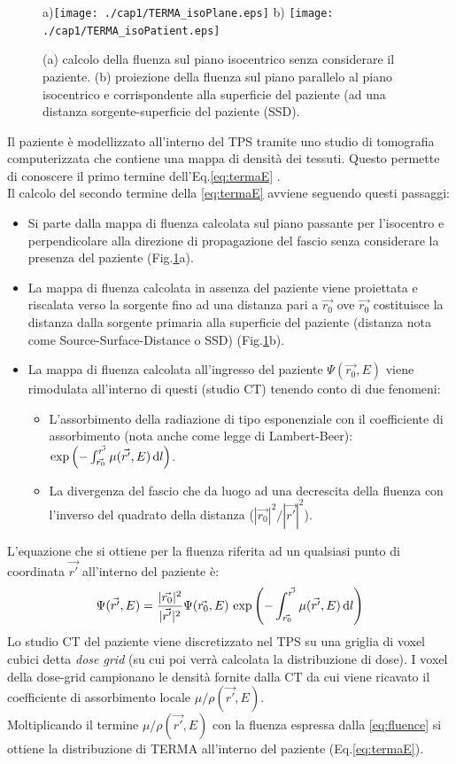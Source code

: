 {\begin{figure}
\centering
a)\texttt{[image: ./cap1/TERMA\_isoPlane.eps]} b)
\texttt{[image: ./cap1/TERMA\_isoPatient.eps]}
\caption{(a) calcolo della fluenza sul piano isocentrico senza considerare il paziente. (b) proiezione della fluenza sul piano parallelo al piano isocentrico e corrispondente alla superficie del paziente (ad una distanza sorgente-superficie del paziente (SSD).}
\label{fig:terma}
\end{figure}
Il paziente è modellizzato all'interno del TPS tramite uno studio di tomografia computerizzata che contiene una mappa di densità dei tessuti. Questo permette di conoscere il primo termine dell'Eq.\eqref{eq:termaE} \cite{RaySearchLaboratories2014}.\\
Il calcolo del secondo termine della \eqref{eq:termaE} avviene seguendo questi passaggi:
\begin{itemize}
\item Si parte dalla mappa di fluenza calcolata sul piano passante per l'isocentro e perpendicolare alla direzione di propagazione del fascio senza considerare la presenza del paziente (Fig.\ref{fig:terma}a).
\item La mappa di fluenza calcolata in assenza del paziente viene proiettata e riscalata verso la sorgente fino ad una distanza pari a $\vec{r_0}$ ove $\vec{r_0}$ costituisce la distanza dalla sorgente primaria alla superficie del paziente (distanza nota come Source-Surface-Distance o SSD) (Fig.\ref{fig:terma}b).
\item La mappa di fluenza calcolata all'ingresso del paziente $\Psi(\vec{r_0},E)$ viene rimodulata all'interno di questi (studio CT) tenendo conto di due fenomeni:
\begin{itemize}
\item L'assorbimento della radiazione di tipo esponenziale con il coefficiente di assorbimento (nota anche come legge di Lambert-Beer): $\exp{\left( -\int_{\vec{r_0}}^{\vec{r'}} \mu(\vec{r'},E) \,\text{d}l \right)}$.
\item La divergenza del fascio che da luogo ad una decrescita della fluenza con l'inverso del quadrato della distanza ($|\vec{r_0}|^2 / |\vec{r'}|^2$).
\end{itemize}
\end{itemize}
L'equazione che si ottiene per la fluenza riferita ad un qualsiasi punto di coordinata $\vec{r'}$ all'interno del paziente è:
\begin{equation}
\label{eq:fluence}
\Psi(\vec{r'},E) = \frac{|\vec{r_0}|^2}{|\vec{r'}|^2}\Psi(\vec{r_0},E)\,\exp{\left( -\int_{\vec{r_0}}^{\vec{r'}} \mu(\vec{r'},E) \,\text{d}l \right)}
\end{equation}
Lo studio CT del paziente viene discretizzato nel TPS su una griglia di voxel cubici detta \textit{dose grid} (su cui poi verrà calcolata la distribuzione di dose). I voxel della dose-grid campionano le densità fornite dalla CT da cui viene ricavato il coefficiente di assorbimento locale $\mu / \rho(\vec{r'},E)$.\\
Moltiplicando il termine $\mu / \rho(\vec{r'},E)$  con la fluenza espressa dalla \eqref{eq:fluence} si ottiene la distribuzione di TERMA all'interno del paziente (Eq.\eqref{eq:termaE}).



}
